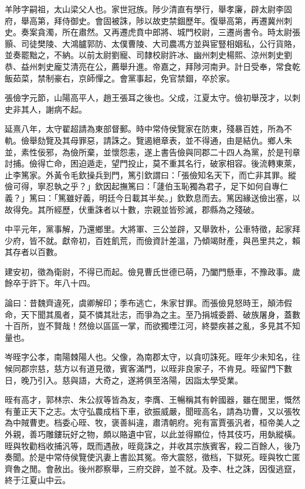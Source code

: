 \begin{pinyinscope}
羊陟字嗣祖，太山梁父人也。家世冠族。陟少清直有學行，舉孝廉，辟太尉李固府，舉高第，拜侍御史。會固被誅，陟以故吏禁錮歷年。復舉高第，再遷冀州刺史。奏案貪濁，所在肅然。又再遷虎賁中郎將、城門校尉，三遷尚書令。時太尉張顥、司徒樊陵、大鴻臚郭防、太僕曹陵、大司農馮方並與宦豎相姻私，公行貨賂，並奏罷黜之，不納。以前太尉劉寵、司隸校尉許冰、幽州刺史楊熙、涼州刺史劉恭、益州刺史龐艾清亮在公，薦舉升進。帝嘉之，拜陟河南尹。計日受奉，常食乾飯茹菜，禁制豪右，京師憚之。會黨事起，免官禁錮，卒於家。

張儉字元節，山陽高平人，趙王張耳之後也。父成，江夏太守。儉初舉茂才，以刺史非其人，謝病不起。

延熹八年，太守翟超請為東部督郵。時中常侍侯覽家在防東，殘暴百姓，所為不軌。儉舉劾覽及其母罪惡，請誅之。覽遏絕章表，並不得通，由是結仇。鄉人朱並，素性佞邪，為儉所棄，並懷怨恚，遂上書告儉與同郡二十四人為黨，於是刊章討捕。儉得亡命，困迫遁走，望門投止，莫不重其名行，破家相容。後流轉東萊，止李篤家。外黃令毛欽操兵到門，篤引欽謂曰：「張儉知名天下，而亡非其罪。縱儉可得，寧忍執之乎？」欽因起撫篤曰：「蘧伯玉恥獨為君子，足下如何自專仁義？」篤曰：「篤雖好義，明廷今日載其半矣。」欽歎息而去。篤因緣送儉出塞，以故得免。其所經歷，伏重誅者以十數，宗親並皆殄滅，郡縣為之殘破。

中平元年，黨事解，乃還鄉里。大將軍、三公並辟，又舉敦朴，公車特徵，起家拜少府，皆不就。獻帝初，百姓飢荒，而儉資計差溫，乃傾竭財產，與邑里共之，賴其存者以百數。

建安初，徵為衛尉，不得已而起。儉見曹氏世德已萌，乃闔門懸車，不豫政事。歲餘卒于許下。年八十四。

論曰：昔魏齊違死，虞卿解印；季布逃亡，朱家甘罪。而張儉見怒時王，顛沛假命，天下聞其風者，莫不憐其壯志，而爭為之主。至乃捐城委爵、破族屠身，蓋數十百所，豈不賢哉！然儉以區區一掌，而欲獨堙江河，終嬰疾甚之亂，多見其不知量也。

岑晊字公孝，南陽棘陽人也。父像，為南郡太守，以貪叨誅死。晊年少未知名，往候同郡宗慈，慈方以有道見徵，賓客滿門，以晊非良家子，不肯見。晊留門下數日，晚乃引入。慈與語，大奇之，遂將俱至洛陽，因詣太學受業。

晊有高才，郭林宗、朱公叔等皆為友，李膺、王暢稱其有幹國器，雖在閭里，慨然有董正天下之志。太守弘農成档下車，欲振威嚴，聞晊高名，請為功曹，又以張牧為中賊曹吏。档委心晊、牧，褒善糾違，肅清朝府。宛有富賈張汎者，桓帝美人之外親，善巧雕鏤玩好之物，頗以賂遺中官，以此並得顯位，恃其伎巧，用埶縱橫。晊與牧勸档收捕汎等，既而遇赦，晊竟誅之，并收其宗族賓客，殺二百餘人，後乃奏聞。於是中常侍侯覽使汎妻上書訟其冤。帝大震怒，徵档，下獄死。晊與牧亡匿齊魯之閒。會赦出。後州郡察舉，三府交辟，並不就。及李、杜之誅，因復逃竄，終于江夏山中云。


\end{pinyinscope}
